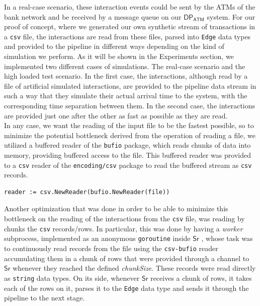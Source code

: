 \documentclass[12pt,a4paper]{article}
\newcommand{\DPATM}{$\mathsf{DP_{ATM}}$ }
\newcommand{\Sr}{$\mathsf{Sr}$ }
\begin{document}
In a real-case scenario, these interaction events could be sent by the ATMs of the bank network and be received by a message queue on our \DPATM system. For our proof of concept, where we generated our own synthetic stream of transactions in a \texttt{csv} file,
the interactions are read from these files, parsed into \texttt{Edge} data types and provided to the pipeline in different ways depending on the kind of simulation we perform. As it will be shown in the Experiments section, we implemented two different cases of simulations. The real-case scenario and the high loaded test scenario. In the first case, the interactions, although read by a file of artificial simulated interactions, are provided to the pipeline data stream in such a way that they simulate their actual arrival time to the system, with the corresponding time separation between them. In the second case, the interactions are provided just one after the other as fast as possible as they are read.\\

In any case, we want the reading of the input file to be the fastest possible, so to minimize the potential bottleneck derived from the operation of reading a file, we utilized a buffered reader of the \texttt{bufio} package, which reads chunks of data into memory, providing buffered access to the file. This buffered reader was provided to a \texttt{csv} reader of the \texttt{encoding/csv} package to read the buffered stream as \texttt{csv} records.

    \begin{center}
    \lstset{style=golangStyle}
    \begin{lstlisting}[caption={\texttt{csv-bufio} reader}]
        reader := csv.NewReader(bufio.NewReader(file))
    \end{lstlisting}
    \end{center}
    
Another optimization that was done in order to be able to minimize this bottleneck on the reading of the interactions from the \texttt{csv} file, was reading by chunks the \texttt{csv} records/rows. In particular, this was done by having a \textit{worker} subprocess, implemented as an anonymous \texttt{goroutine} inside \Sr, whose task was to continuously read records from the file using the \texttt{csv-bufio} reader accumulating them in a chunk of rows that were provided through a channel to \Sr whenever they reached the defined \emph{chunkSize}. These records were read directly as \texttt{string} data types. On its side, whenever \Sr receives a chunk of rows, it takes each of the rows on it, parses it to the \texttt{Edge} data type and sends it through the pipeline to the next stage.\\
\end{document}
